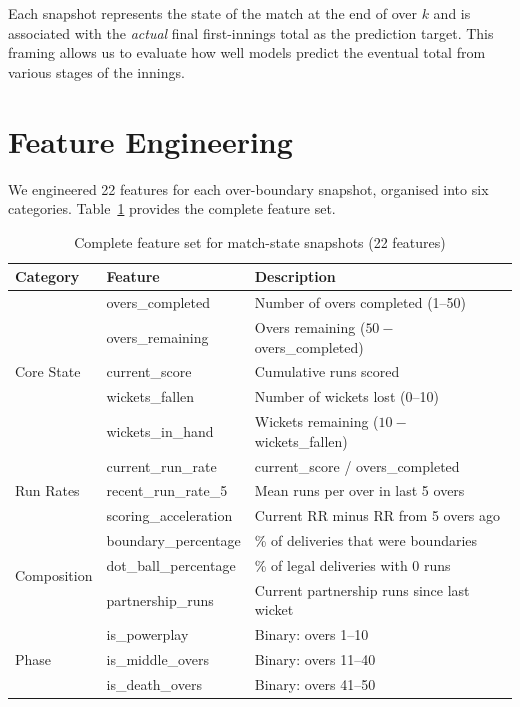 \documentclass[12pt,a4paper,oneside]{report}
\begin{document}
Each snapshot represents the state of the match at the end of over $k$ and is associated with the \textit{actual} final first-innings total as the prediction target. This framing allows us to evaluate how well models predict the eventual total from various stages of the innings.

\section{Feature Engineering}
\label{sec:features}

We engineered 22 features for each over-boundary snapshot, organised into six categories. Table~\ref{tab:features} provides the complete feature set.

\begin{table}[htbp]
\centering
\caption{Complete feature set for match-state snapshots (22 features)}
\label{tab:features}
\small
\begin{tabular}{llp{7cm}}
\toprule
\textbf{Category} & \textbf{Feature} & \textbf{Description} \\
\midrule
\multirow{5}{*}{Core State} & overs\_completed & Number of overs completed (1--50) \\
 & overs\_remaining & Overs remaining ($50 - $ overs\_completed) \\
 & current\_score & Cumulative runs scored \\
 & wickets\_fallen & Number of wickets lost (0--10) \\
 & wickets\_in\_hand & Wickets remaining ($10 - $ wickets\_fallen) \\
\midrule
\multirow{3}{*}{Run Rates} & current\_run\_rate & current\_score / overs\_completed \\
 & recent\_run\_rate\_5 & Mean runs per over in last 5 overs \\
 & scoring\_acceleration & Current RR minus RR from 5 overs ago \\
\midrule
\multirow{3}{*}{Composition} & boundary\_percentage & \% of deliveries that were boundaries \\
 & dot\_ball\_percentage & \% of legal deliveries with 0 runs \\
 & partnership\_runs & Current partnership runs since last wicket \\
\midrule
\multirow{3}{*}{Phase} & is\_powerplay & Binary: overs 1--10 \\
 & is\_middle\_overs & Binary: overs 11--40 \\
 & is\_death\_overs & Binary: overs 41--50 \\

\end{tabular}
\end{table}
\end{document}
